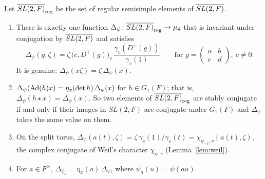 \begin{lemma}\label{lem:Delta}
Let $\overline{SL(2,F)}_{\mathrm{reg}}$ be the set of regular semisimple elements of
$\overline{SL(2,F)}$.
\begin{enumerate}[label=(\alph*)]
\item There is exactly one function $\Delta_\psi\colon
  \overline{SL(2,F)}_{\mathrm{reg}}\to\mu_4$ that is invariant under conjugation by
  $\overline{SL(2,F)}$ and satisfies
  \begin{equation}\label{eq:Delta}
  \Delta_\psi(g,\zeta)=\zeta\,\bigl(c,D^+(g)\bigr)_v\,
  \frac{\gamma_v(D^+(g))}{\gamma_v(1)}\qquad\text{for }
  g=\begin{pmatrix}\alpha&b\\c&d\end{pmatrix},\ c\ne0.
  \end{equation}
  It is genuine: $\Delta_\psi(x\zeta)=\zeta\,\Delta_\psi(x)$.
\item $\Delta_\psi(\operatorname{Ad}(h)x)=\eta_x(\det h)\,\Delta_\psi(x)$ for
  $h\in G_1(F)$; that is, $\Delta_\psi(h\star x)=\Delta_\psi(x)$. So two
  elements of $\overline{SL(2,F)}_{\mathrm{reg}}$ are stably conjugate if and only if
  their images in $SL(2,F)$ are conjugate under $G_1(F)$ and
  $\Delta_\psi$ takes the same value on them.
\item On the split torus, $\Delta_\psi(a(t),\zeta)=\zeta\,\gamma_v(1)/
  \gamma_v(t)=\chi_{\psi_{-1},v}(a(t),\zeta)$, the complex conjugate of
  Weil's character $\chi_{\psi,v}$ (Lemma~\ref{lem:weil}).
\item For $a\in F^\times$, $\Delta_{\psi_a}=\eta_x(a)\,\Delta_\psi$, where
  $\psi_a(u)=\psi(au)$.
\end{enumerate}
\end{lemma}

